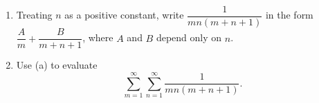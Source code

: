 \begin{enumerate}
\item[(a)] Treating $n$ as a positive constant, write $\dfrac{1}{mn(m+n+1)}$ in the form $\dfrac{A}{m}+\dfrac{B}{m+n+1}$, where $A$ and $B$ depend only on $n$.
\item[(b)] Use (a) to evaluate
\[\sum_{m=1}^{\infty}\sum_{n=1}^{\infty}\dfrac{1}{mn(m+n+1)} .\]
\end{enumerate}
